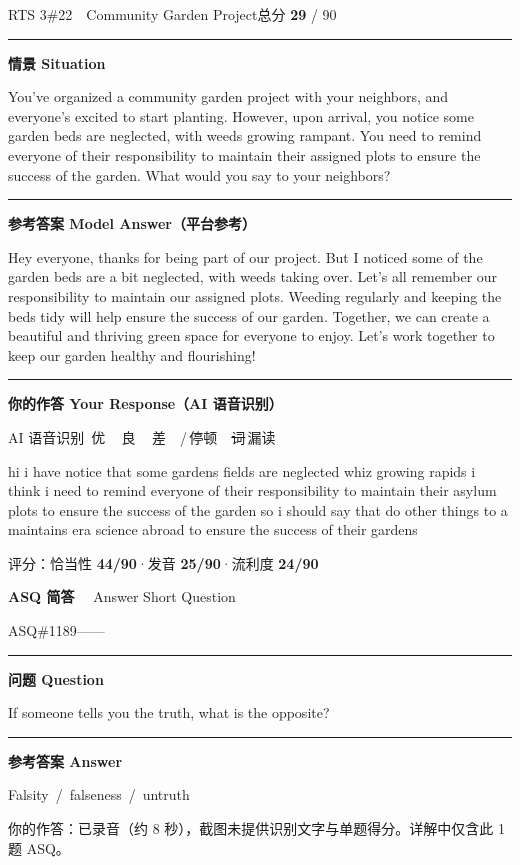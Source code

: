 \documentclass[11pt]{article}
\newcommand{\spart}[1]{\textcolor{cPartial}{\bfseries #1}} %
\newcommand{\szero}[1]{\textcolor{cWrong}{\bfseries #1}}   %
\newcommand{\ptesub}[1]{%
  \par\needspace{2\baselineskip}\smallskip
  {\color{cAccent}\rule[-0.2ex]{3pt}{1.05em}}\hspace{6pt}%
  {\bfseries\color{cHead}#1}\par\nopagebreak\smallskip}
\newcommand{\ptetask}[2]{%
  \needspace{4\baselineskip}\medskip
  \begin{tcolorbox}[enhanced, colback=cHead, colframe=cHead, sharp corners,
     left=12pt, right=12pt, top=5pt, bottom=5pt, boxrule=0pt]
    {\large\bfseries\color{white} #1}\ \ {\color{white!80} #2}
  \end{tcolorbox}\smallskip}
\newcommand{\sg}[1]{\textcolor{cSpkGood}{#1}}   %
\newcommand{\sy}[1]{\textcolor{cSpkOk}{#1}}     %
\newcommand{\sr}[1]{\textcolor{cSpkBad}{#1}}    %
\newcommand{\asrlegend}{{\footnotesize\color{gray}AI 语音识别\quad
  {\color{cSpkGood}\textbullet}\,优\ \ {\color{cSpkOk}\textbullet}\,良\ \
  {\color{cSpkBad}\textbullet}\,差\ \ {\color{gray}/}\,停顿\ \
  {\color{cSpkBad}\sout{词}}\,漏读}}
\begin{document}
\begin{qblock}{RTS 3\quad \#22\ \ Community Garden Project}{总分 \textcolor{cAccent}{\bfseries 29} / 90}
\ptesub{情景 Situation}
\begin{promptbox}
You've organized a community garden project with your neighbors, and everyone's excited to start planting. However, upon arrival, you notice some garden beds are neglected, with weeds growing rampant. You need to remind everyone of their responsibility to maintain their assigned plots to ensure the success of the garden. What would you say to your neighbors?
\end{promptbox}
\ptesub{参考答案 Model Answer（平台参考）}
\begin{modelbox}
Hey everyone, thanks for being part of our project. But I noticed some of the garden beds are a bit neglected, with weeds taking over. Let's all remember our responsibility to maintain our assigned plots. Weeding regularly and keeping the beds tidy will help ensure the success of our garden. Together, we can create a beautiful and thriving green space for everyone to enjoy. Let's work together to keep our garden healthy and flourishing!
\end{modelbox}
\ptesub{你的作答 Your Response（AI 语音识别）}
\asrlegend
\begin{asrbox}
\sg{hi i have notice that some gardens fields} \sy{are} \sr{neglected} \sy{whiz} \sy{growing rapids i think i need to remind everyone of their} \sg{responsibility to} \sr{maintain} \sg{their} \sr{asylum} \sy{plots} \sg{to ensure the} \sg{success of the garden so i should say that} \sr{do} \sg{other things} \sy{to a} \sr{maintains era} \sy{science} \sr{abroad} \sg{to ensure the success of their} \sg{gardens}
\end{asrbox}
{\small 评分：恰当性 \spart{44/90}\quad·\quad 发音 \szero{25/90}\quad·\quad 流利度 \szero{24/90}}
\end{qblock}

\ptetask{ASQ 简答}{Answer Short Question}

\begin{qblock}{ASQ\quad \#1189}{——}
\ptesub{问题 Question}
\begin{promptbox}
If someone tells you the truth, what is the opposite?
\end{promptbox}
\ptesub{参考答案 Answer}
\begin{modelbox}
Falsity\ /\ falseness\ /\ untruth
\end{modelbox}
{\footnotesize\color{gray} 你的作答：已录音（约 8 秒），截图未提供识别文字与单题得分。详解中仅含此 1 题 ASQ。}
\end{qblock}
\end{document}
